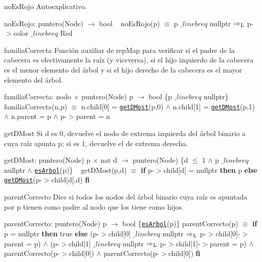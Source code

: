 \begin{DoxyParagraph}{no\+Es\+Rojo}
Autoexplicativo.

no\+Es\+Rojo\+: puntero(\+Node) $\to$ bool ~\newline
no\+Es\+Rojo(p) $\equiv$ p $\_linebr eq$ nullptr $\Rightarrow_{\rm L}$ p-\/$>$color $\_linebr eq$ Red


\end{DoxyParagraph}
\begin{DoxyParagraph}{familia\+Correcta}
Función auxiliar de rep\+Map para verificar si el padre de la cabecera es efectivamente la raíz (y viceversa), si el hijo izquierdo de la cabecera es el menor elemento del árbol y si el hijo derecho de la cabecera es el mayor elemento del árbol.

familia\+Correcta\+: nodo $\times$ puntero(\+Node) p $\to$ bool \{p $\_linebr eq$ nullptr\} ~\newline
familia\+Correcta(n,p) $\equiv$ n.\+child\mbox{[}0\mbox{]} = \href{axiomas.html#getDMost}{\tt get\+D\+Most}(p,0) $\land$ n.\+child\mbox{[}1\mbox{]} = \href{axiomas.html#getDMost}{\tt get\+D\+Most}(p,1) $\land$ n.\+parent = p $\land$ p-\/$>$parent = n


\end{DoxyParagraph}
\begin{DoxyParagraph}{get\+D\+Most}
Si d es 0, devuelve el nodo de extrema izquierda del árbol binario a cuya raíz apunta p; si es 1, devuelve el de extrema derecha.

get\+D\+Most\+: puntero(\+Node) p $\times$ nat d $\to$ puntero(\+Node) \{d $\leq$ 1 $\land$ p $\_linebr eq$ nullptr $\land$ \href{axiomas.html#esArbol}{\tt es\+Arbol}(p)\} ~\newline
get\+D\+Most(p,d) $\equiv$ {\bfseries if} p-\/$>$child\mbox{[}d\mbox{]} = nullptr {\bfseries then} p {\bfseries else} \href{axiomas.html#getDMost}{\tt get\+D\+Most}(p-\/$>$child\mbox{[}d\mbox{]},d) {\bfseries fi} 


\end{DoxyParagraph}
\begin{DoxyParagraph}{parent\+Correcto}
Dice si todos los nodos del árbol binario cuya raíz es apuntada por p tienen como padre al nodo que los tiene como hijos.

parent\+Correcto\+: puntero(\+Node) p $\to$ bool \{\href{axiomas.html#esArbol}{\tt es\+Arbol}(p)\} parent\+Correcto(p) $\equiv$ {\bfseries if} p = nullptr {\bfseries then} true {\bfseries else} (p-\/$>$child\mbox{[}0\mbox{]} $\_linebr eq$ nullptr $\Rightarrow_{\rm L}$ p-\/$>$child\mbox{[}0\mbox{]}-\/$>$parent = p) $\land$ (p-\/$>$child\mbox{[}1\mbox{]} $\_linebr eq$ nullptr $\Rightarrow_{\rm L}$ p-\/$>$child\mbox{[}1\mbox{]}-\/$>$parent = p) $\land$ parent\+Correcto(p-\/$>$child\mbox{[}0\mbox{]}) $\land$ parent\+Correcto(p-\/$>$child\mbox{[}0\mbox{]}) {\bfseries fi} 


\end{DoxyParagraph}
